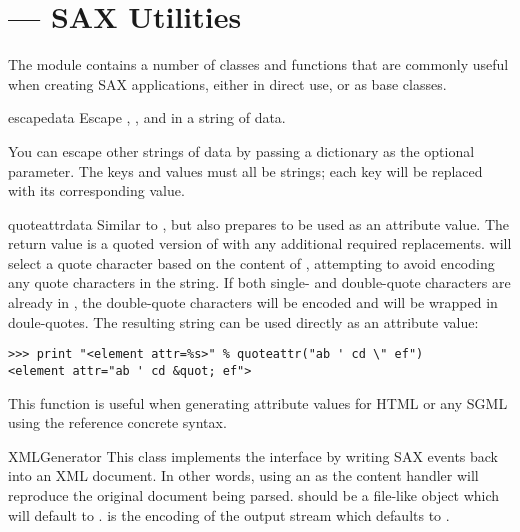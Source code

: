 \section{ ---
         SAX Utilities}




The module  contains a number of classes and
functions that are commonly useful when creating SAX applications,
either in direct use, or as base classes.

\begin{funcdesc}{escape}{data}
  Escape \character{\&}, \character{<}, and \character{>} in a string
  of data.

  You can escape other strings of data by passing a dictionary as the
  optional  parameter.  The keys and values must all be
  strings; each key will be replaced with its corresponding value.
\end{funcdesc}

\begin{funcdesc}{quoteattr}{data}
  Similar to , but also prepares  to be
  used as an attribute value.  The return value is a quoted version of
   with any additional required replacements.
   will select a quote character based on the
  content of , attempting to avoid encoding any quote
  characters in the string.  If both single- and double-quote
  characters are already in , the double-quote characters
  will be encoded and  will be wrapped in doule-quotes.  The
  resulting string can be used directly as an attribute value:

\begin{verbatim}
>>> print "<element attr=%s>" % quoteattr("ab ' cd \" ef")
<element attr="ab ' cd &quot; ef">
\end{verbatim}

  This function is useful when generating attribute values for HTML or
  any SGML using the reference concrete syntax.
\end{funcdesc}

\begin{classdesc}{XMLGenerator}{}
  This class implements the  interface by
  writing SAX events back into an XML document. In other words, using
  an  as the content handler will reproduce the
  original document being parsed.  should be a file-like
  object which will default to .  is the
  encoding of the output stream which defaults to .
\end{classdesc}

